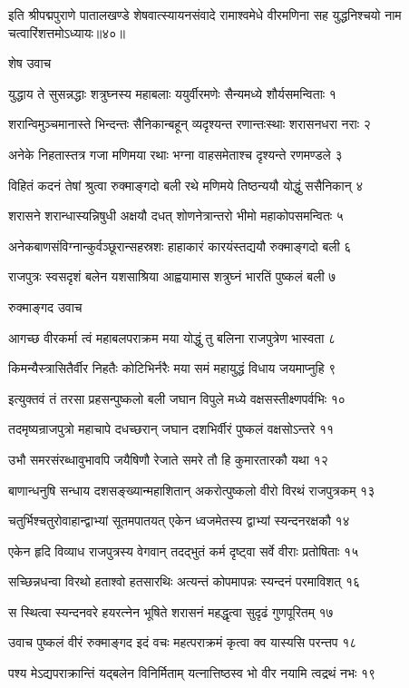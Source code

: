 इति श्रीपद्मपुराणे पातालखण्डे शेषवात्स्यायनसंवादे रामाश्वमेधे वीरमणिना सह युद्धनिश्चयो नाम चत्वारिंशत्तमोऽध्यायः॥४०॥


शेष उवाच

युद्धाय ते सुसन्नद्धाः शत्रुघ्नस्य महाबलाः
ययुर्वीरमणेः सैन्यमध्ये शौर्यसमन्विताः १

शरान्विमुञ्चमानास्ते भिन्दन्तः सैनिकान्बहून्
व्यदृश्यन्त रणान्तःस्थाः शरासनधरा नराः २

अनेके निहतास्तत्र गजा मणिमया रथाः
भग्ना वाहसमेताश्च दृश्यन्ते रणमण्डले ३

विहितं कदनं तेषां श्रुत्वा रुक्माङ्गदो बली
रथे मणिमये तिष्ठन्ययौ योद्धुं ससैनिकान् ४

शरासने शरान्धास्यन्निषुधी अक्षयौ दधत्
शोणनेत्रान्तरो भीमो महाकोपसमन्वितः ५

अनेकबाणसंविग्नान्कुर्वञ्छूरान्सहस्रशः
हाहाकारं कारयंस्तद्ययौ रुक्माङ्गदो बली ६

राजपुत्रः स्वसदृशं बलेन यशसाश्रिया
आह्वयामास शत्रुघ्नं भारतिं पुष्कलं बली ७

रुक्माङ्गद उवाच

आगच्छ वीरकर्मा त्वं महाबलपराक्रम
मया योद्धुं तु बलिना राजपुत्रेण भास्वता ८

किमन्यैस्त्रासितैर्वीर निहतैः कोटिभिर्नरैः
मया समं महायुद्धं विधाय जयमाप्नुहि ९

इत्युक्तवं तं तरसा प्रहसन्पुष्कलो बली
जघान विपुले मध्ये वक्षसस्तीक्ष्णपर्वभिः १०

तदमृष्यन्राजपुत्रो महाचापे दधच्छरान्
जघान दशभिर्वीरं पुष्कलं वक्षसोऽन्तरे ११

उभौ समरसंरब्धावुभावपि जयैषिणौ
रेजाते समरे तौ हि कुमारतारकौ यथा १२

बाणान्धनुषि सन्धाय दशसङ्ख्यान्महाशितान्
अकरोत्पुष्कलो वीरो विरथं राजपुत्रकम् १३

चतुर्भिश्चतुरोवाहान्द्वाभ्यां सूतमपातयत्
एकेन ध्वजमेतस्य द्वाभ्यां स्यन्दनरक्षकौ १४

एकेन हृदि विव्याध राजपुत्रस्य वेगवान्
तदद्भुतं कर्म दृष्ट्वा सर्वे वीराः प्रतोषिताः १५

सच्छिन्नधन्वा विरथो हताश्वो हतसारथिः
अत्यन्तं कोपमापन्नः स्यन्दनं परमाविशत् १६

स स्थित्वा स्यन्दनवरे हयरत्नेन भूषिते
शरासनं महद्धृत्वा सुदृढं गुणपूरितम् १७

उवाच पुष्कलं वीरं रुक्माङ्गद इदं वचः
महत्पराक्रमं कृत्वा क्व यास्यसि परन्तप १८

पश्य मेऽद्यपराक्रान्तिं यद्बलेन विनिर्मिताम्
यत्नात्तिष्ठस्व भो वीर नयामि त्वद्रथं नभः १९

